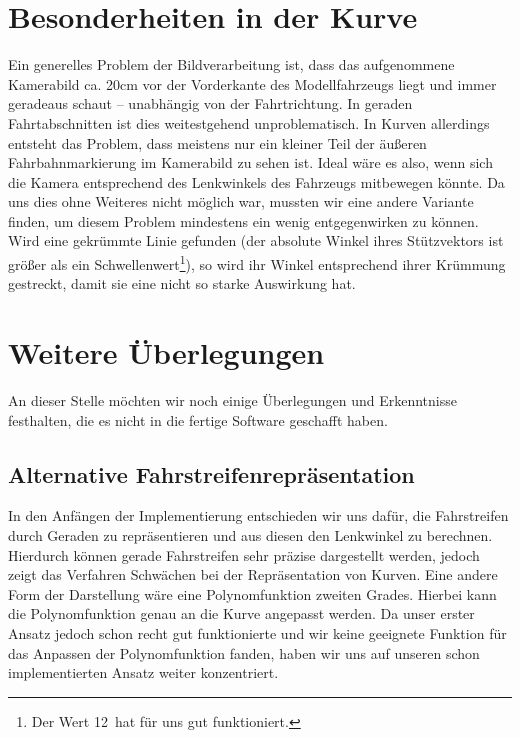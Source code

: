 \documentclass[a4paper,12pt]{report}
\begin{document}
\section{Besonderheiten in der Kurve}
	
	Ein generelles Problem der Bildverarbeitung ist, dass das aufgenommene Kamerabild ca. 20cm vor der Vorderkante des Modellfahrzeugs liegt und immer geradeaus schaut -- unabhängig von der Fahrtrichtung.
	In geraden Fahrtabschnitten ist dies weitestgehend unproblematisch.
	In Kurven allerdings entsteht das Problem, dass meistens nur ein kleiner Teil der äußeren Fahrbahnmarkierung im Kamerabild zu sehen ist.
	Ideal wäre es also, wenn sich die Kamera entsprechend des Lenkwinkels des Fahrzeugs mitbewegen könnte.
	Da uns dies ohne Weiteres nicht möglich war, mussten wir eine andere Variante finden, um diesem Problem mindestens ein wenig entgegenwirken zu können.
	Wird eine gekrümmte Linie gefunden (der absolute Winkel ihres Stützvektors ist größer als ein Schwellenwert\footnote{Der Wert 12\degree\ hat für uns gut funktioniert.}), so wird ihr Winkel entsprechend ihrer Krümmung gestreckt, damit sie eine nicht so starke Auswirkung hat.	

\section{Weitere Überlegungen}

	An dieser Stelle möchten wir noch einige Überlegungen und Erkenntnisse festhalten,
	die es nicht in die fertige Software geschafft haben.

\subsection{Alternative Fahrstreifenrepräsentation}

	In den Anfängen der Implementierung entschieden wir uns dafür, die Fahrstreifen durch Geraden zu repräsentieren und aus diesen den Lenkwinkel zu berechnen.
	Hierdurch können gerade Fahrstreifen sehr präzise dargestellt werden, jedoch zeigt das Verfahren Schwächen bei der Repräsentation von Kurven.
	Eine andere Form der Darstellung wäre eine Polynomfunktion zweiten Grades.
	Hierbei kann die Polynomfunktion genau an die Kurve angepasst werden.
	Da unser erster Ansatz jedoch schon recht gut funktionierte und wir keine geeignete Funktion für das Anpassen der Polynomfunktion fanden, haben wir uns auf unseren schon implementierten Ansatz weiter konzentriert.
\end{document}

